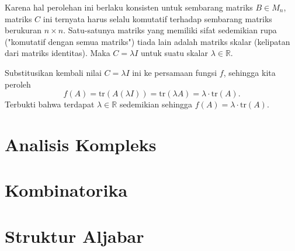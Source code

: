 \documentclass[11pt,a4paper]{article}
\newcommand{\R}{\mathbb{R}}
\begin{document}
\begin{enumerate}
\begin{enumerate}
                Karena hal perolehan ini berlaku konsisten untuk sembarang matriks $B \in M_n$, matriks $C$ ini ternyata harus selalu komutatif terhadap sembarang matriks berukuran $n \times n$.
                Satu-satunya matriks yang memiliki sifat sedemikian rupa ("komutatif dengan semua matriks") tiada lain adalah matriks skalar (kelipatan dari matriks identitas).
                Maka $C = \lambda I$ untuk suatu skalar $\lambda \in \R$.

                Substitusikan kembali nilai $C = \lambda I$ ini ke persamaan fungsi $f$, sehingga kita peroleh
                \[
                  f(A) = \text{tr}(A(\lambda I)) = \text{tr}(\lambda A) = \lambda \cdot \text{tr}(A).
                \]
                Terbukti bahwa terdapat $\lambda \in \R$ sedemikian sehingga $f(A) = \lambda \cdot \text{tr}(A)$.
        \end{enumerate}


\end{enumerate}

\section*{Analisis Kompleks}

\section*{Kombinatorika}

\section*{Struktur Aljabar}
\end{document}
